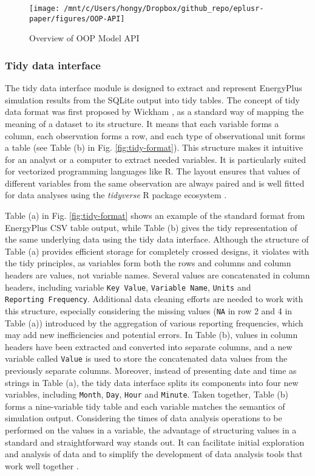 \documentclass[3p, times]{elsarticle} %
\begin{document}
\begin{figure}[!htb]
\texttt{[image: /mnt/c/Users/hongy/Dropbox/github\_repo/eplusr-paper/figures/OOP-API]} \caption{Overview of OOP Model API}\label{fig:oop-api}
\end{figure}

\hypertarget{sec:eplusr-tidy}{%
\subsubsection{Tidy data interface}\label{sec:eplusr-tidy}}

The tidy data interface module is designed to extract and represent EnergyPlus
simulation results from the SQLite output into tidy tables.
The concept of tidy data format was first proposed by Wickham \citep{Wickham2014},
as a standard way of mapping the meaning of a dataset to its structure.
It means that each variable forms a column, each observation forms a row, and
each type of observational unit forms a table (see Table (b) in Fig.
\ref{fig:tidy-format}).
This structure makes it intuitive for an analyst or a computer to extract
needed variables.
It is particularly suited for vectorized programming languages like R.
The layout ensures that values of different variables from the same observation
are always paired \citep{Wickham2014, Wickham2017} and is well fitted for data
analyses using the \emph{tidyverse} R package ecosystem \citep{Wickham2019}.

Table (a) in Fig. \ref{fig:tidy-format} shows an example of the standard
format from EnergyPlus CSV table output, while Table (b) gives the tidy
representation of the same underlying data using the tidy data interface.
Although the structure of Table (a) provides efficient storage for completely
crossed designs, it violates with the tidy principles, as variables form both
the rows and columns and column headers are values, not variable names.
Several values are concatenated in column headers, including variable \texttt{Key\ Value}, \texttt{Variable\ Name}, \texttt{Units} and \texttt{Reporting\ Frequency}.
Additional data cleaning efforts are needed to work with this structure,
especially considering the missing values (\texttt{NA} in row 2 and 4 in Table (a))
introduced by the aggregation of various reporting frequencies, which may
add new inefficiencies and potential errors.
In Table (b), values in column headers have been extracted and converted into
separate columns, and a new variable called \texttt{Value} is used to store the
concatenated data values from the previously separate columns.
Moreover, instead of presenting date and time as strings in Table (a), the tidy
data interface splits its components into four new variables, including
\texttt{Month}, \texttt{Day}, \texttt{Hour} and \texttt{Minute}.
Taken together, Table (b) forms a nine-variable tidy table and each variable
matches the semantics of simulation output.
Considering the times of data analysis operations to be performed on the values
in a variable, the advantage of structuring values in a standard and
straightforward way stands out.
It can facilitate initial exploration and analysis of data and to simplify the
development of data analysis tools that work well together \citep{Wickham2014}.
\end{document}
